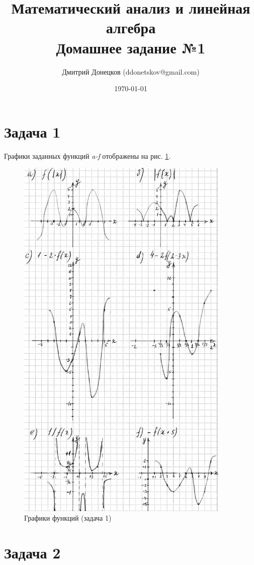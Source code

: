 \documentclass[a4paper,11pt]{article}
\title{\vspace{-1.5cm}Математический анализ и линейная алгебра \\
Домашнее задание №1}
\author{Дмитрий Донецков (ddonetskov@gmail.com)}
\date{\today}
\begin{document}
\maketitle

\section{Задача 1}

Графики заданных функций \textit{a-f} отображены на рис. \ref{fig:task1}.

\begin{figure}[h!]
  \centering
    \includegraphics[height=18cm]{images/task1.jpg}
  \caption{Графики функций (задача 1)}
  \label{fig:task1}
\end{figure}

\section{Задача 2}
\end{document}
